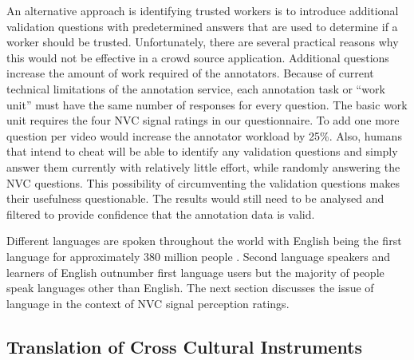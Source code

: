 
An alternative approach is identifying trusted workers is to introduce additional validation questions with predetermined answers that are used to determine if a worker should be trusted. Unfortunately, there are several practical reasons why this would not be effective in a crowd source application. Additional questions increase the amount of work required of the annotators. Because of current technical limitations of the annotation service, each annotation task or ``work unit'' must have the same number of responses for every question. The basic work unit requires the four \ac{NVC} signal ratings in our questionnaire. To add one more question per video would increase the annotator workload by 25\%. Also, humans that intend to cheat will be able to identify any validation questions and simply answer them currently with relatively little effort, while randomly answering the \ac{NVC} questions. This possibility of circumventing the validation questions makes their usefulness questionable. The results would still need to be analysed and filtered to provide confidence that the annotation data is valid.

Different languages are spoken throughout the world with English being the first language for approximately 380 million people \cite{Economist2001}. Second language speakers and learners of English outnumber first language users but the majority of people speak languages other than English. The next section discusses the issue of language in the context of \ac{NVC} signal perception ratings.

\subsection{Translation of Cross Cultural Instruments}
\label{SectionTranslationOfInstrument}

